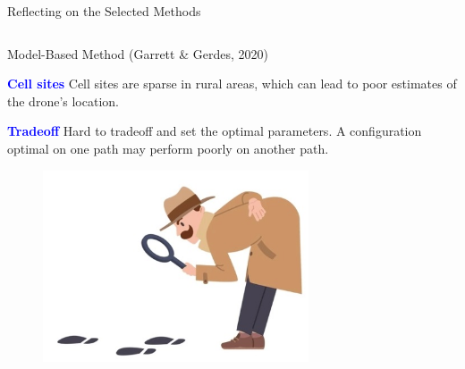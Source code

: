 \documentclass[aspectratio=169, 8pt]{beamer}
\begin{document}
\begin{frame}{Reflecting on the Selected Methods}
\begin{columns}[T]
    
    \begin{column}{0.5\linewidth}
        \begin{block}{Model-Based Method (Garrett \& Gerdes, 2020)}
            \item \textbf{\textcolor{blue}{Cell sites}} Cell sites are sparse in rural areas, which can lead to poor estimates of the drone’s location.
            \item \textbf{\textcolor{blue}{Tradeoff}} Hard to tradeoff and set the optimal parameters. A configuration optimal on one path may perform poorly on another path.
        \end{block}
        \begin{figure}
            \centering
            \includegraphics[width = 0.7\textwidth]{images/curious.png}
            \label{fig:enter-label}
        \end{figure}
    \end{column}
\end{columns}


    
\end{frame}
\end{document}
